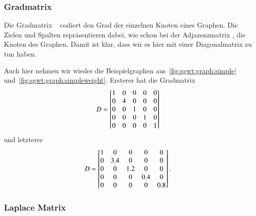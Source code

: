 \subsubsection{Gradmatrix \texorpdfstring{\degreeM{}}{D}}

Die Gradmatrix \degreeM{}~\cite{noauthor_degree_2018} codiert den Grad der 
einzelnen Knoten eines Graphen. Die Zielen und Spalten repr\"asentieren dabei, 
wie schon bei der Adjazenzmatrix \adjacencyM{}, die Knoten des Graphen. Damit 
ist klar, dass wir es hier mit einer Diagonalmatrix zu tun haben.

Auch hier nehmen wir wieder die Beispielgraphen 
aus~\cref{fig:sgwt:graph:simple} und~\cref{fig:sgwt:graph:simpleweight}. 
Ersterer hat die Gradmatrix
\begin{equation*}
\degreeM =
\begin{bmatrix}
1 & 0 & 0 & 0 & 0 \\
0 & 4 & 0 & 0 & 0 \\
0 & 0 & 1 & 0 & 0 \\
0 & 0 & 0 & 1 & 0 \\
0 & 0 & 0 & 0 & 1
\end{bmatrix}
\end{equation*}
und letzterer
\begin{equation*}
\degreeM =
\begin{bmatrix}
1 & 0 & 0 & 0 & 0 \\
0 & 3.4 & 0 & 0 & 0 \\
0 & 0 & 1.2 & 0 & 0 \\
0 & 0 & 0 & 0.4 & 0 \\
0 & 0 & 0 & 0 & 0.8
\end{bmatrix}.
\end{equation*}

\subsubsection{Laplace Matrix \texorpdfstring{\laplaceL{}}{L}}

